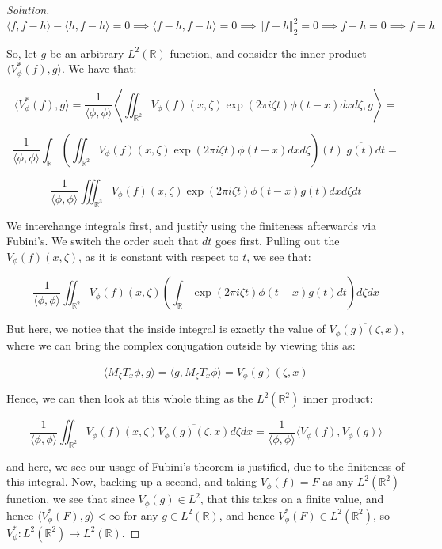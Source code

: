 \documentclass[10pt]{article}
\begin{document}
\begin{proof}[Solution]
$$ \langle f, f - h \rangle - \langle h, f - h \rangle = 0 \implies \langle f - h, f -h \rangle = 0 \implies \Vert f- h \Vert_2^2 = 0 \implies f - h= 0 \implies f = h$$

So, let $g$ be an arbitrary $L^2(\mathbb{R})$ function, and consider the inner product $\langle V^*_\phi(f), g \rangle$. We have that:

$$ \langle V^*_\phi(f), g \rangle = \frac{1}{ \langle \phi, \phi \rangle } \left\langle \iint_{\mathbb{R}^2} V_\phi(f)(x, \zeta) \exp(2\pi i \zeta t) \phi(t - x) dx d\zeta, g \right\rangle  = $$

$$  \frac{1}{ \langle \phi, \phi \rangle }\int_{\mathbb{R}} \left(\iint_{\mathbb{R}^2} V_\phi(f)(x, \zeta) \exp(2\pi i \zeta t) \phi(t - x) dx d\zeta\right)(t) \; \overline{g(t)} dt  = $$

$$   \frac{1}{ \langle \phi, \phi \rangle } \iiint_{\mathbb{R}^3} V_\phi(f)(x, \zeta) \exp(2\pi i \zeta t )\phi(t - x)\overline{g(t)} dx d\zeta dt $$

We interchange integrals first, and justify using the finiteness afterwards via Fubini's. We switch the order such that $dt$ goes first. Pulling out the $V_\phi(f)(x, \zeta)$, as it is constant with respect to $t$, we see that:

$$  \frac{1}{ \langle \phi, \phi \rangle } \iint_{\mathbb{R}^2} V_\phi(f)(x, \zeta) \left( \int_{\mathbb{R}} \exp(2 \pi i \zeta t) \phi(t - x) \overline{g(t)} dt \right) d\zeta dx $$

But here, we notice that the inside integral is exactly the value of $\overline{V_\phi(g)(\zeta, x)}$, where we can bring the complex conjugation outside by viewing this as:

$$ \langle M_\zeta T_x \phi, g \rangle = \overline{\langle g, M_\zeta T_x \phi \rangle} = \overline{V_\phi(g)(\zeta, x)}$$

Hence, we can then look at this whole thing as the $L^2(\mathbb{R}^2)$ inner product:

$$ \frac{1}{ \langle \phi, \phi \rangle } \iint_{\mathbb{R}^2} V_\phi(f)(x, \zeta) \overline{V_\phi(g)(\zeta, x)} d\zeta dx =  \frac{1}{ \langle \phi, \phi \rangle } \langle V_\phi(f), V_\phi(g) \rangle $$

and here, we see our usage of Fubini's theorem is justified, due to the finiteness of this integral. Now, backing up a second, and taking $V_\phi(f) = F$ as any $L^2(\mathbb{R}^2)$ function, we see that since $V_\phi(g) \in L^2$, that this takes on a finite value, and hence $\langle V^*_\phi(F), g \rangle < \infty$ for any $g \in L^2(\mathbb{R})$, and hence $V^*_\phi(F) \in L^2(\mathbb{R}^2)$, so $V^*_\phi: L^2(\mathbb{R}^2) \to L^2(\mathbb{R})$. 


\end{proof}
\end{document}
